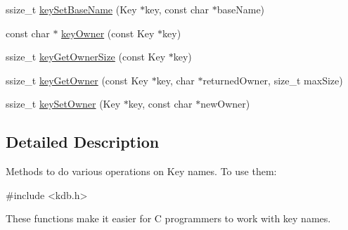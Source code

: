\begin{DoxyCompactItemize}
ssize\-\_\-t \hyperlink{group__keyname_ga6e804bd453f98c28b0ff51430d1df407}{key\-Set\-Base\-Name} (Key $\ast$key, const char $\ast$base\-Name)
\item 
const char $\ast$ \hyperlink{group__keyname_gaf6485fb8599714b6bbd830cf915ffea5}{key\-Owner} (const Key $\ast$key)
\item 
ssize\-\_\-t \hyperlink{group__keyname_ga4a4561895741ba2ad10acf007c188593}{key\-Get\-Owner\-Size} (const Key $\ast$key)
\item 
ssize\-\_\-t \hyperlink{group__keyname_ga35922a017bee8b4bcb493bbdfad9d6f5}{key\-Get\-Owner} (const Key $\ast$key, char $\ast$returned\-Owner, size\-\_\-t max\-Size)
\item 
ssize\-\_\-t \hyperlink{group__keyname_ga88d6ec200ba0707b7c1b4a88133d2be4}{key\-Set\-Owner} (Key $\ast$key, const char $\ast$new\-Owner)
\end{DoxyCompactItemize}


\subsection{Detailed Description}
Methods to do various operations on Key names. To use them\-: 
\begin{DoxyCode}
\textcolor{preprocessor}{#include <kdb.h>}
\end{DoxyCode}


These functions make it easier for C programmers to work with key names.

